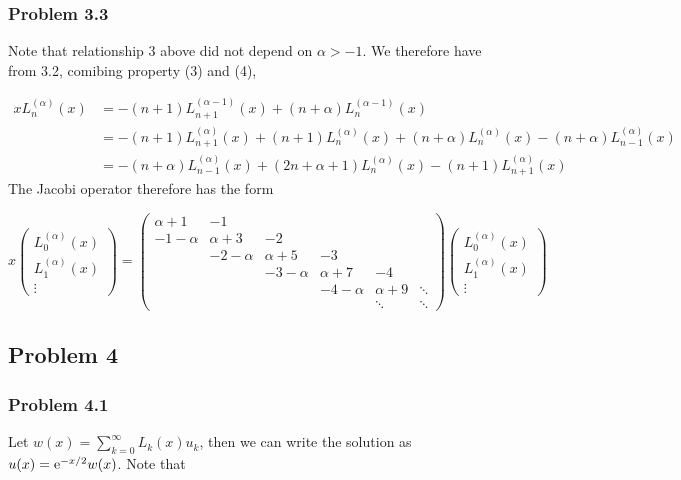 \documentclass[12pt,a4paper]{article}
\def\E{ {\rm e} }
\begin{document}
\subsubsection{Problem 3.3}
Note that relationship 3 above did not depend on $\alpha >-1$.  We therefore have from 3.2, comibing property (3) and (4),


\begin{align*}
x L_n^{(\alpha)}(x) &= -(n+1)L_{n+1}^{(\alpha-1)}(x) +(n+\alpha)L_n^{(\alpha-1)}(x) \\
  &= -(n+1)L_{n+1}^{(\alpha)}(x) + (n+1)L_{n}^{(\alpha)}(x) +(n+\alpha)L_{n}^{(\alpha)}(x) - (n+\alpha)L_{n-1}^{(\alpha)}(x) \\
  &= - (n+\alpha)L_{n-1}^{(\alpha)}(x) + (2n+\alpha+1) L_n^{(\alpha)}(x) -(n+1)L_{n+1}^{(\alpha)}(x)
\end{align*}
The Jacobi operator therefore has the form

\[
x \begin{pmatrix} L_0^{(\alpha)}(x) \\
            L_1^{(\alpha)}(x) \\
                \vdots
                \end{pmatrix} = \begin{pmatrix} \alpha+1 &-1 \\
                                                -1-\alpha & \alpha+3 & -2 \\
                                                   & -2-\alpha & \alpha+5 &-3 \\                  &       & -3-\alpha & \alpha+7 &-4 \\
                                                      &&   & -4-\alpha & \alpha+9 &\ddots \\
                                                      &&&&\ddots & \ddots
                                                    \end{pmatrix} \begin{pmatrix} L_0^{(\alpha)}(x) \\
            L_1^{(\alpha)}(x) \\
                \vdots
                \end{pmatrix}
\]
\subsection{Problem 4}
\subsubsection{Problem 4.1}
Let $w(x) = \sum_{k = 0}^{\infty}L_k(x)u_k$, then we can write the solution as $u(x) = \E^{-x/2}w(x)$. Note that
\end{document}
